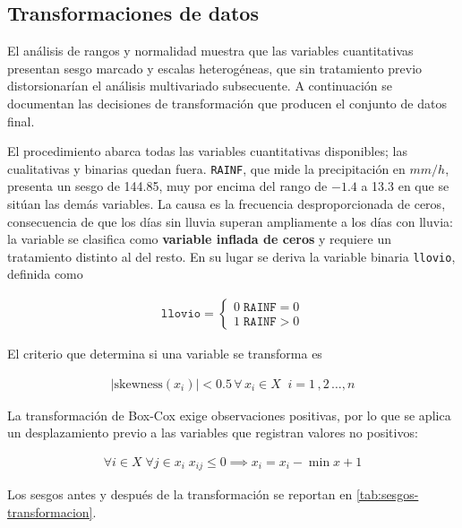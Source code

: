 \subsection{Transformaciones de datos}\label{sec:transformaciones}

El análisis de rangos y normalidad muestra que las variables cuantitativas
presentan sesgo marcado y escalas heterogéneas, que sin tratamiento previo
distorsionarían el análisis multivariado subsecuente. A continuación se
documentan las decisiones de transformación que producen el conjunto de datos
final.

El procedimiento abarca todas las variables cuantitativas disponibles; las
cualitativas y binarias quedan fuera. \texttt{RAINF}, que mide la
precipitación en $mm/h$, presenta un sesgo de 144.85, muy por encima del rango
de $-1.4$ a 13.3 en que se sitúan las demás variables. La causa es la frecuencia
desproporcionada de ceros, consecuencia de que los días sin lluvia superan
ampliamente a los días con lluvia: la variable se clasifica como
\textbf{variable inflada de ceros} y requiere un tratamiento distinto al del
resto. En su lugar se deriva la variable binaria \texttt{llovio}, definida
como

\begin{align}
     \texttt{llovio}=\begin{cases}
        0\;\texttt{RAINF} = 0\\
        1\;\texttt{RAINF} > 0
    \end{cases}
\end{align}

El criterio que determina si una variable se transforma es

\begin{align}
    |\text{skewness}(x_i)|<0.5\,\forall\, x_i\in X\;\;i=1\,,2\,\dots,n
\end{align}

La transformación de Box-Cox exige observaciones positivas, por lo que se
aplica un desplazamiento previo a las variables que registran valores no
positivos:

\begin{align}
    \forall i\in X\;\forall j\in x_i\;x_{ij} \leq0 \implies x_i = x_i - \min{x} + 1
\end{align}

Los sesgos antes y después de la transformación se reportan en
\cref{tab:sesgos-transformacion}.

